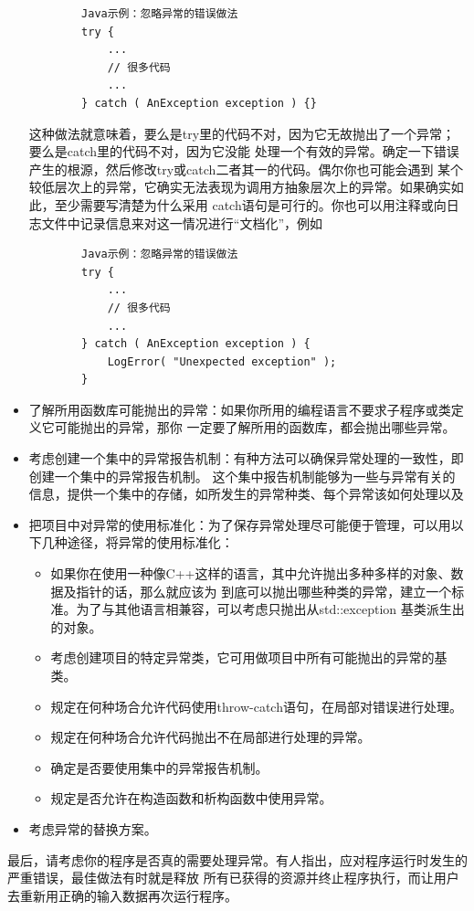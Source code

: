 \documentclass{article}
\begin{document}
\begin{itemize}
\begin{lstlisting}
        Java示例：忽略异常的错误做法
        try {
            ...
            // 很多代码
            ...
        } catch ( AnException exception ) {}
    \end{lstlisting}
    这种做法就意味着，要么是try里的代码不对，因为它无故抛出了一个异常；要么是catch里的代码不对，因为它没能
    处理一个有效的异常。确定一下错误产生的根源，然后修改try或catch二者其一的代码。偶尔你也可能会遇到
    某个较低层次上的异常，它确实无法表现为调用方抽象层次上的异常。如果确实如此，至少需要写清楚为什么采用
    catch语句是可行的。你也可以用注释或向日志文件中记录信息来对这一情况进行“文档化”，例如
    \begin{lstlisting}
        Java示例：忽略异常的错误做法
        try {
            ...
            // 很多代码
            ...
        } catch ( AnException exception ) {
            LogError( "Unexpected exception" );
        }
    \end{lstlisting}
    \item 了解所用函数库可能抛出的异常：如果你所用的编程语言不要求子程序或类定义它可能抛出的异常，那你
    一定要了解所用的函数库，都会抛出哪些异常。
    \item 考虑创建一个集中的异常报告机制：有种方法可以确保异常处理的一致性，即创建一个集中的异常报告机制。
    这个集中报告机制能够为一些与异常有关的信息，提供一个集中的存储，如所发生的异常种类、每个异常该如何处理以及
    \item 把项目中对异常的使用标准化：为了保存异常处理尽可能便于管理，可以用以下几种途径，将异常的使用标准化：
    \begin{itemize}
        \item 如果你在使用一种像C++这样的语言，其中允许抛出多种多样的对象、数据及指针的话，那么就应该为
        到底可以抛出哪些种类的异常，建立一个标准。为了与其他语言相兼容，可以考虑只抛出从std::exception
        基类派生出的对象。
        \item 考虑创建项目的特定异常类，它可用做项目中所有可能抛出的异常的基类。
        \item 规定在何种场合允许代码使用throw-catch语句，在局部对错误进行处理。
        \item 规定在何种场合允许代码抛出不在局部进行处理的异常。
        \item 确定是否要使用集中的异常报告机制。
        \item 规定是否允许在构造函数和析构函数中使用异常。
    \end{itemize}
    \item 考虑异常的替换方案。
\end{itemize}
最后，请考虑你的程序是否真的需要处理异常。有人指出，应对程序运行时发生的严重错误，最佳做法有时就是释放
所有已获得的资源并终止程序执行，而让用户去重新用正确的输入数据再次运行程序。
\end{document}
